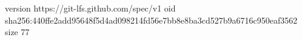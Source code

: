 version https://git-lfs.github.com/spec/v1
oid sha256:440ffe2add95648f5d4ad098214fd56e7bb8e8ba3cd527b9a6716c950eaf3562
size 77
